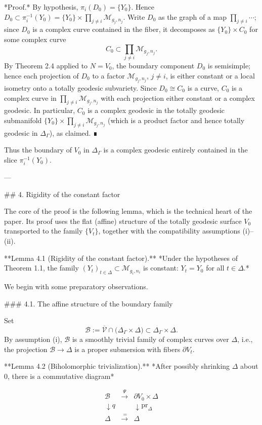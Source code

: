 *Proof.* By hypothesis, $\pi_i(D_0) = \{Y_0\}$. Hence $D_0 \subset \pi_i^{-1}(Y_0) = \{Y_0\} \times \prod_{j \neq i} \mathcal{M}_{g_j, n_j}$. Write $D_0$ as the graph of a map $\prod_{j \neq i} \cdots$; since $D_0$ is a complex curve contained in the fiber, it decomposes as $\{Y_0\} \times C_0$ for some complex curve
$$C_0 \subset \prod_{j \neq i} \mathcal{M}_{g_j, n_j}.$$
By Theorem 2.4 applied to $N = V_0$, the boundary component $D_0$ is semisimple; hence each projection of $D_0$ to a factor $\mathcal{M}_{g_j, n_j}$, $j \neq i$, is either constant or a local isometry onto a totally geodesic subvariety. Since $D_0 \cong C_0$ is a curve, $C_0$ is a complex curve in $\prod_{j \neq i}\mathcal{M}_{g_j, n_j}$ with each projection either constant or a complex geodesic. In particular, $C_0$ is a complex geodesic in the totally geodesic submanifold $\{Y_0\} \times \prod_{j \neq i} \mathcal{M}_{g_j, n_j}$ (which is a product factor and hence totally geodesic in $\Delta_\Gamma$), as claimed. ∎

Thus the boundary of $V_0$ in $\Delta_\Gamma$ is a complex geodesic entirely contained in the slice $\pi_i^{-1}(Y_0)$.

---

## 4. Rigidity of the constant factor

The core of the proof is the following lemma, which is the technical heart of the paper. Its proof uses the flat (affine) structure of the totally geodesic surface $V_0$ transported to the family $\{V_t\}$, together with the compatibility assumptions (i)–(ii).

**Lemma 4.1 (Rigidity of the constant factor).** *Under the hypotheses of Theorem 1.1, the family $(Y_t)_{t\in\Delta} \subset \mathcal{M}_{g_i, n_i}$ is constant: $Y_t = Y_0$ for all $t \in \Delta$.*

We begin with some preparatory observations.

### 4.1. The affine structure of the boundary family

Set
$$\mathcal{B} := \overline{\mathcal{V}} \cap \bigl(\Delta_\Gamma \times \Delta\bigr) \subset \Delta_\Gamma \times \Delta.$$
By assumption (i), $\mathcal{B}$ is a smoothly trivial family of complex curves over $\Delta$, i.e., the projection $\mathcal{B} \to \Delta$ is a proper submersion with fibers $\partial V_t$.

**Lemma 4.2 (Biholomorphic trivialization).** *After possibly shrinking $\Delta$ about $0$, there is a commutative diagram*

$$
\begin{array}{ccc}
\mathcal{B} & \xrightarrow{\ \Psi\ } & \partial V_0 \times \Delta \\
\downarrow{\scriptstyle q} & & \downarrow{\scriptstyle \mathrm{pr}_\Delta} \\
\Delta & \xrightarrow{\ =} & \Delta
\end{array}
$$

